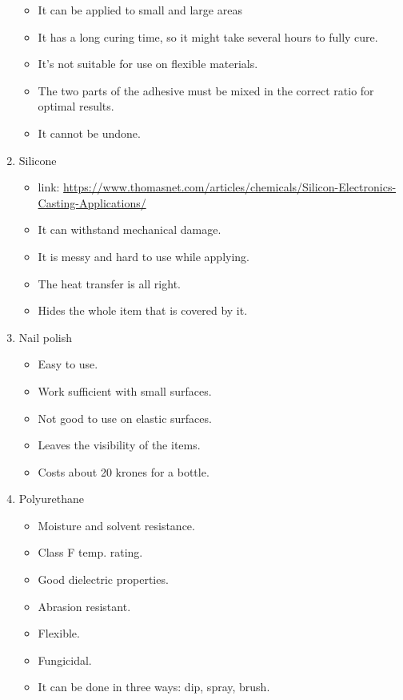 \documentclass{article}[10pt]
\begin{document}
\begin{enumerate}
\begin{itemize}
            \item It can be applied to small and large areas
            \item It has a long curing time, so it might take several hours to fully cure.
            \item It's not suitable for use on flexible materials.
            \item The two parts of the adhesive must be mixed in the correct ratio for optimal results.
            \item It cannot be undone.
        \end{itemize}
    \item Silicone
        \begin{itemize}
            \item link: \url{https://www.thomasnet.com/articles/chemicals/Silicon-Electronics-Casting-Applications/}
            \item It can withstand mechanical damage.
            \item It is messy and hard to use while applying.
            \item The heat transfer is all right.
            \item Hides the whole item that is covered by it.
        \end{itemize}
    \item Nail polish
        \begin{itemize}
            \item Easy to use.
            \item Work sufficient with small surfaces.
            \item Not good to use on elastic surfaces.
            \item Leaves the visibility of the items.
            \item Costs about 20 krones for a bottle.
        \end{itemize}
    \item Polyurethane
        \begin{itemize}
            \item Moisture and solvent resistance.
            \item Class F temp. rating.
            \item Good dielectric properties.
            \item Abrasion resistant.
            \item Flexible.
            \item Fungicidal.
            \item It can be done in three ways: dip, spray, brush.

\end{itemize}
\end{enumerate}
\end{document}
